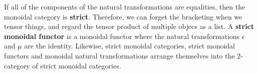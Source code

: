 





If all of the components of the natural transformations are equalities, then the monoidal category is {\bf strict}.  Therefore, we can forget the bracketing when we tensor things, and regard the tensor product of multiple objecs as a list.
A {\bf strict monoidal functor} is a monoidal functor where the natural transformations $\epsilon$ and $\mu$ are the identity.
Likewise, strict monoidal categories, strict monoidal functors and monoidal natural transformations arrange themselves into the 2-category of strict monoidal categories.




